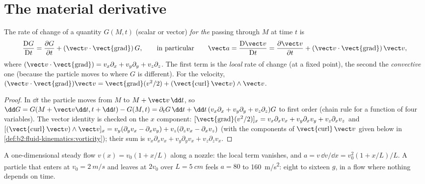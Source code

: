 \section{The material derivative}

\begin{theorem}\label{thm:b2:fluid-kinematics:material}
The rate of change of a quantity $G(M, t)$ (scalar or vector) \emph{for
the } passing through $M$ at time $t$ is
\[
\frac{\mathrm DG}{\mathrm Dt} = \frac{\partial G}{\partial t} + (\vect v\cdot
\operatorname{\vect{grad}})\,G ,
\qquad\text{in particular}\qquad
\vect a = \frac{\mathrm D\vect v}{\mathrm Dt} = \frac{\partial\vect v}{\partial t} +
(\vect v\cdot\operatorname{\vect{grad}})\,\vect v ,
\]
where $(\vect v\cdot\operatorname{\vect{grad}}) = v_x\partial_x + v_y\partial_y +
v_z\partial_z$. The first term is the \emph{local} rate of change (at a
fixed point), the second the \emph{convective} one (because the particle
moves to where $G$ is different). For the velocity, $(\vect v\cdot
\operatorname{\vect{grad}})\vect v = \operatorname{\vect{grad}}(v^2/2) +
(\operatorname{\vect{curl}}\vect v)\wedge\vect v$.
\end{theorem}

\begin{proof}
In $\dd t$ the particle moves from $M$ to $M + \vect v\,\dd t$, so $\dd G =
G(M + \vect v\dd t, t + \dd t) - G(M, t) = \partial_tG\,\dd t + \dd t\,(v_x\partial_x
+ v_y\partial_y + v_z\partial_z)G$ to first order (chain rule for a function
of four variables). The vector identity is checked on the $x$
component: $[\operatorname{\vect{grad}}(v^2/2)]_x = v_x\partial_xv_x + v_y\partial_x
v_y + v_z\partial_xv_z$ and $[(\operatorname{\vect{curl}}\vect v)\wedge\vect v]_x =
v_y(\partial_yv_x - \partial_xv_y) + v_z(\partial_zv_x - \partial_xv_z)$ (with the
components of $\operatorname{\vect{curl}}\vect v$ given below in
\cref{def:b2:fluid-kinematics:vorticity}); their sum is $v_x\partial_xv_x +
v_y\partial_yv_x + v_z\partial_zv_x$.
\end{proof}

\begin{example}\label{ex:b2:fluid-kinematics:nozzle}
A one-dimensional steady flow $v(x) = v_0(1 + x/L)$ along a nozzle: the
local term vanishes, and $a = v\,\dd v/\dd x = v_0^2(1 + x/L)/L$. A
particle that enters at $v_0 = \qty{2}{m/s}$ and leaves at $2v_0$ over $L
= \qty{5}{cm}$ feels $a = 80$ to \qty{160}{m/s^2}: eight to sixteen $g$, in a
flow where nothing depends on time.
\end{example}

